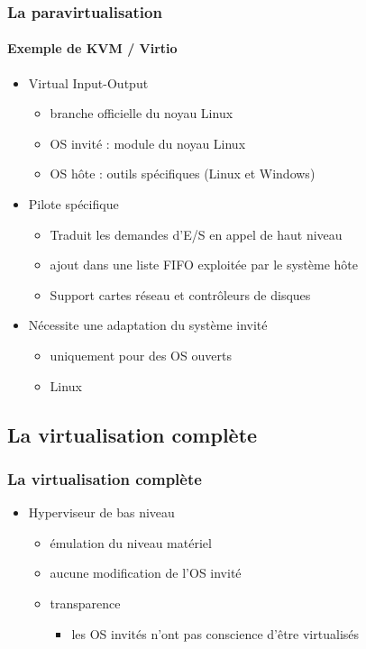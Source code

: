 \begin{frame}
\frametitle{La paravirtualisation}
\framesubtitle{Exemple de KVM / Virtio}
\begin{itemize}
\item Virtual Input-Output
\begin{itemize}
\item branche officielle du noyau Linux
\item OS invité : module du noyau Linux
\item OS hôte : outils spécifiques (Linux et Windows)
\end{itemize}
\item Pilote spécifique
\begin{itemize}
\item Traduit les demandes d'E/S en appel de haut niveau
\item ajout dans une liste FIFO exploitée par le système hôte
\item Support cartes réseau et contrôleurs de disques
\end{itemize}
\item Nécessite une adaptation du système invité
\begin{itemize}
\item uniquement pour des OS ouverts
\item Linux
\end{itemize}
\end{itemize}
\end{frame}


\subsection{La virtualisation complète}

\begin{frame}
\frametitle{La virtualisation complète}
\begin{itemize}
\item Hyperviseur de bas niveau
\begin{itemize}
\item émulation du niveau matériel
\item aucune modification de l'OS invité
\item transparence
\begin{itemize}
\item les OS invités n'ont pas conscience d'être virtualisés
\end{itemize}
\end{itemize}
\end{itemize}
\end{frame}

